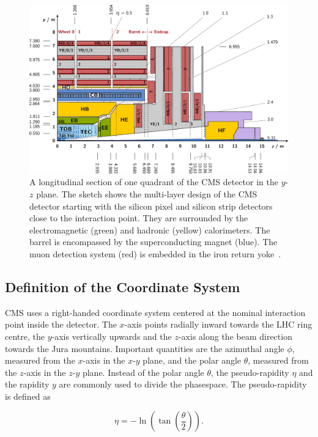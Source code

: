 \begin{figure}[htp]
    \centering
    \includegraphics[width=1.0\textwidth]{figures/cms_detector/cms_longitudinal_section.pdf}
    \caption[Longitudinal section of the CMS
    detector]{A longitudinal section of one quadrant of the CMS
        detector in the $y$-$z$ plane. The sketch shows
    the multi-layer design of the CMS detector starting with the silicon pixel
and silicon strip detectors close to the interaction point. They are surrounded
by the electromagnetic (green) and hadronic (yellow) calorimeters. The barrel is
encompassed by the superconducting magnet (blue). The muon detection system
(red) is embedded in the iron return yoke~\cite{Berger:2014aca}.}
    \label{fig:cms:longitudinal_section}
\end{figure}

\subsection{Definition of the Coordinate System}

CMS uses a right-handed coordinate system centered at the nominal interaction point inside the
detector. The $x$-axis points radially inward towards the LHC ring centre, the
$y$-axis vertically upwards and the $z$-axis along the beam direction towards
the Jura mountains. Important quantities are the azimuthal angle $\phi$,
measured from the $x$-axis in the $x$-$y$ plane, and the polar angle $\theta$,
measured from the $z$-axis in the $z$-$y$ plane. Instead of the polar angle
$\theta$, the pseudo-rapidity $\eta$ and the rapidity $y$ are commonly used to
divide the phasespace. The pseudo-rapidity is defined as

\begin{equation*}
    \eta = - \ln \left( \tan \left( \frac{\theta}{2} \right) \right).
\end{equation*}

